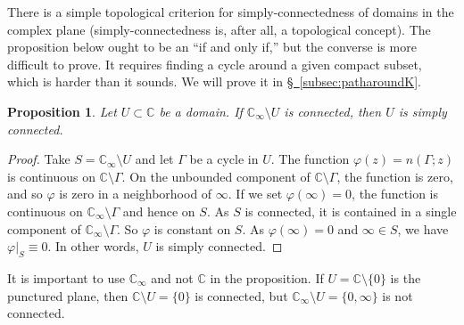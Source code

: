 \documentclass[12pt,openany]{book}
\newcommand{\C}{{\mathbb{C}}}
\newcommand{\myquote}[1]{``#1''}
\theoremstyle{plain}
\newtheorem{prop}[thm]{Proposition}
\theoremstyle{remark}
\theoremstyle{definition}
\theoremstyle{exercise}
\theoremstyle{example}
\newcommand{\subsectionref}[1]{\hyperref[#1]{\S~\ref*{#1}}}
\begin{document}
There is a simple topological criterion for
simply-connectedness of domains in the complex plane
(simply-connectedness is, after all, a topological concept).
The proposition below ought to be an \myquote{if and only if,} but the
converse is more difficult to prove.
It requires finding a cycle around
a given compact subset,
which is harder than it sounds.
We will prove it in \subsectionref{subsec:patharoundK}.

\begin{prop} \label{prop:scbycomplementeasy}
Let $U \subset \C$ be a domain.  If
$\C_\infty \setminus U$ is connected, then $U$ is simply connected.
\end{prop}

\begin{proof}
Take $S = \C_\infty \setminus U$ and let $\Gamma$ be a cycle in $U$.
The function $\varphi(z)= n(\Gamma;z)$ is continuous on 
$\C \setminus \Gamma$.
On the unbounded component of $\C \setminus \Gamma$, the
function is zero, and so $\varphi$ is zero in a neighborhood of $\infty$.
If we set $\varphi(\infty) = 0$, the function is continuous
on $\C_\infty \setminus \Gamma$ and hence on $S$.  As $S$ is connected,
it is contained in
a single component of $\C_\infty \setminus \Gamma$.
So $\varphi$ is
constant on $S$.
As $\varphi(\infty) = 0$ and $\infty \in S$, we have $\varphi|_S \equiv 0$.
In other words, $U$ is simply connected.
\end{proof}

It is important to use $\C_\infty$ and not $\C$ in the proposition.
If $U = \C \setminus \{ 0 \}$ is the punctured plane, then
$\C \setminus U = \{ 0 \}$ is connected, but 
$\C_\infty \setminus U = \{ 0, \infty \}$ is not connected.
\end{document}
